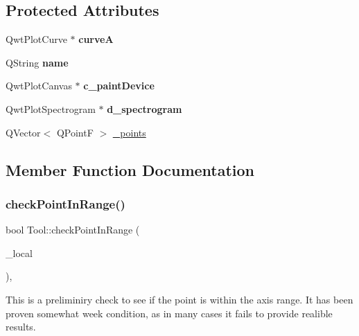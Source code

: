 \subsection*{Protected Attributes}
\begin{DoxyCompactItemize}
\item 
\mbox{\label{classRectTool_a97033d50439b655b4fdf9688fe77a88e}} 
Qwt\+Plot\+Curve $\ast$ {\bfseries curveA}
\item 
\mbox{\label{classTool_af0935d8e8edd73d8ec85424b5b15196b}} 
Q\+String {\bfseries name}
\item 
\mbox{\label{classTool_a1e301a03c5806c900786760d80049380}} 
Qwt\+Plot\+Canvas $\ast$ {\bfseries c\+\_\+paint\+Device}
\item 
\mbox{\label{classTool_af1d11cc5374ba7eb7c1d41cfb5d4e981}} 
Qwt\+Plot\+Spectrogram $\ast$ {\bfseries d\+\_\+spectrogram}
\item 
Q\+Vector$<$ Q\+PointF $>$ \mbox{\hyperlink{classTool_a68be77a2e364a7b13d7206388ba5843e}{\+\_\+points}}
\end{DoxyCompactItemize}


\subsection{Member Function Documentation}
\mbox{\label{classTool_a81244366dc1b9f55465ed6f37b81033c}} 
\subsubsection{\texorpdfstring{check\+Point\+In\+Range()}{checkPointInRange()}}
{\footnotesize\ttfamily bool Tool\+::check\+Point\+In\+Range (\begin{DoxyParamCaption}\item[{const Q\+PointF \&}]{\+\_\+local }\end{DoxyParamCaption})\hspace{0.3cm}{\ttfamily [protected]}, {\ttfamily [inherited]}}

This is a preliminiry check to see if the point is within the axis range. It has been proven somewhat week condition, as in many cases it fails to provide realible results. \mbox{\label{classRectTool_a22ddb88797de61ed921a5cd3462383ea}} 
